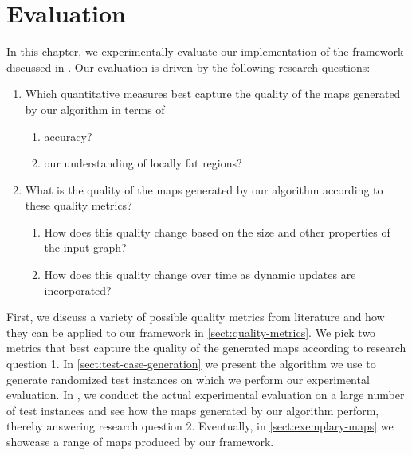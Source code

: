 \chapter{Evaluation}
\label{chap:evaluation}

In this chapter, we experimentally evaluate our implementation of the framework discussed in . Our evaluation is driven by the following research questions:

\begin{enumerate}
	\item Which quantitative measures best capture the quality of the maps generated by our algorithm in terms of
	\begin{enumerate}
	\item accuracy?
	\item our understanding of locally fat regions?
	\end{enumerate}
	\item What is the quality of the maps generated by our algorithm according to these quality metrics?
	\begin{enumerate}
	\item How does this quality change based on the size and other properties of the input graph?
	\item How does this quality change over time as dynamic updates are incorporated?
	\end{enumerate}
\end{enumerate}

First, we discuss a variety of possible quality metrics from literature and how they can be applied to our framework in \cref{sect:quality-metrics}.
We pick two metrics that best capture the quality of the generated maps according to research question 1.
In \cref{sect:test-case-generation} we present the algorithm we use to generate randomized test instances on which we perform our experimental evaluation.
In , we conduct the actual experimental evaluation on a large number of test instances and see how the maps generated by our algorithm perform, thereby answering research question 2.
Eventually, in \cref{sect:exemplary-maps} we showcase a range of maps produced by our framework.


\clearpage

\clearpage

\clearpage

\clearpage

